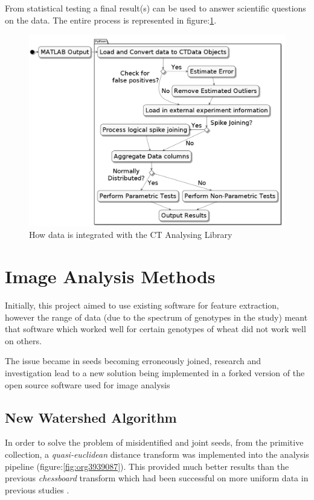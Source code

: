 \documentclass[11pt]{report}
\begin{document}
From statistical testing a final result(s) can be used to answer scientific questions on the data. The entire process is represented in figure:\ref{fig:orgd5c957f}.
\clearpage
\begin{figure}[htbp]
\centering
\includegraphics[width=18cm]{./images/pipeline.png}
\caption{\label{fig:orgd5c957f}
How data is integrated with the CT Analysing Library}
\end{figure}

\section{Image Analysis Methods}
\label{sec:orgaf65680}
Initially, this project aimed to use existing software for feature extraction, however the range of data (due to the spectrum of genotypes in the study) meant that software which worked well for certain genotypes of wheat did not work well on others.

The issue became in seeds becoming erroneously joined, research and investigation lead to a new solution being implemented in a forked version of the open source software used for image analysis \cite{Hughes2017}

\subsection{New Watershed Algorithm}
\label{sec:org32dfabb}

In order to solve the problem of misidentified and joint seeds, from the primitive collection,
a  \emph{quasi-euclidean} distance transform was implemented into the analysis pipeline (figure:\ref{fig:org3939087}). This provided much better results than the previous
\emph{chessboard} transform which had been successful on more uniform data in previous studies \cite{Hughes2017}.
\end{document}
